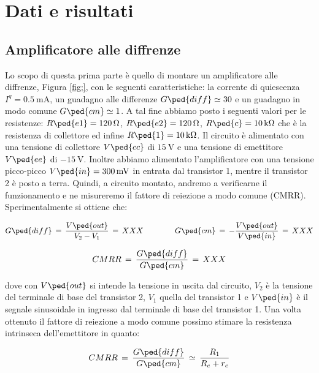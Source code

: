 \section*{Dati e risultati}

\subsection*{Amplificatore alle diffrenze}

Lo scopo di questa prima parte è quello di montare un amplificatore alle diffrenze, Figura \ref{fig:}, con le seguenti caratteristiche: la corrente di quiescenza $I^q=\SI{0.5}{\milli\ampere}$, un guadagno alle differenze $G\ped{diff} \simeq 30$ e un guadagno in modo comune $G\ped{cm} \simeq 1$.
A tal fine abbiamo posto i seguenti valori per le resistenze: $R\ped{e1} = \SI{120}{\ohm}$, $R\ped{e2} = \SI{120}{\ohm}$, $R\ped{c} = \SI{10}{\kilo\ohm}$ che è la resistenza di collettore ed infine $R\ped{1} = \SI{10}{\kilo\ohm}$. Il circuito è alimentato con una tensione di collettore $V\ped{cc}$ di $\SI{15}{\volt}$ e una tensione di emettitore $V\ped{ee}$ di $\SI{-15}{\volt}$.
Inoltre abbiamo alimentato l'amplificatore con una tensione picco-picco $V\ped{in} = \SI{300}{\milli\volt}$ in entrata dal transistor 1, mentre il transistor 2 è posto a terra.
Quindi, a circuito montato, andremo a verificarne il funzionamento e ne misureremo il fattore di reiezione a modo comune (CMRR).
Sperimentalmente si ottiene che:

\begin{equation}
	G\ped{diff}\,=\,\frac{V\ped{out}}{V_2-V_1}\,=\, XXX \qquad\qquad G\ped{cm}\,=\,-\frac{V\ped{out}}{V\ped{in}}\,=\, XXX
	\label{eq:G}
\end{equation}

\begin{equation}
	CMRR\,=\,\frac{G\ped{diff}}{G\ped{cm}}\,=\, XXX
	\label{eq:cmrr}
\end{equation}

dove con $V\ped{out}$ si intende la tensione in uscita dal circuito, $V_2$ è la tensione del terminale di base del transistor 2, $V_1$ quella del transistor 1 e $V\ped{in}$ è il segnale sinusoidale in ingresso dal terminale di base del transistor 1.
Una volta ottenuto il fattore di reiezione a modo comune possimo stimare la resistenza intrinseca dell'emettitore in quanto:

\begin{equation}
	CMRR\,=\,\frac{G\ped{diff}}{G\ped{cm}}\,\simeq\,\frac{R_1}{R_e + r_e}
\end{equation}

